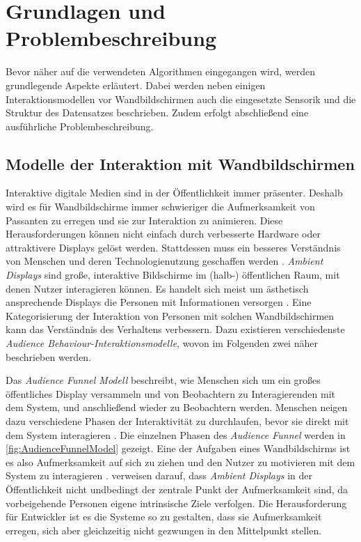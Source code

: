 \chapter{Grundlagen und Problembeschreibung}
\label{chapter2}
Bevor näher auf die verwendeten Algorithmen eingegangen wird,
werden grundlegende Aspekte erläutert.
Dabei werden neben einigen Interaktionsmodellen vor Wandbildschirmen
auch die eingesetzte Sensorik und die Struktur des Datensatzes beschrieben.
Zudem erfolgt abschließend eine ausführliche Problembeschreibung.


\section{Modelle der Interaktion mit Wandbildschirmen}
\label{2-ModelleInteraktion-Wandbildschirme}
Interaktive digitale Medien sind in der Öffentlichkeit immer präsenter.
Deshalb wird es für Wandbildschirme immer schwieriger die Aufmerksamkeit von Passanten zu erregen
und sie zur Interaktion zu animieren.
Diese Herausforderungen können nicht einfach durch verbesserte Hardware oder attraktivere Displays gelöst werden.
Stattdessen muss ein besseres Verständnis von Menschen und deren Technologienutzung geschaffen werden \citep{wouters_uncovering_2016}.
\emph{Ambient Displays} sind große, interaktive Bildschirme im (halb-) öffentlichen Raum, mit denen Nutzer interagieren können.
Es handelt sich meist um ästhetisch ansprechende Displays die Personen mit Informationen versorgen \citep{mankoff_heuristic_2003}.
Eine Kategorisierung der Interaktion von Personen mit solchen Wandbildschirmen kann das Verständnis des Verhaltens verbessern.
Dazu existieren verschiedenste \emph{Audience Behaviour-Interaktionsmodelle}, wovon im Folgenden zwei näher beschrieben werden.

Das \emph{Audience Funnel Modell} beschreibt, wie Menschen sich um ein großes öffentliches Display versammeln
und von Beobachtern zu Interagierenden mit dem System, und anschließend wieder zu Beobachtern werden.
Menschen neigen dazu verschiedene Phasen der Interaktivität zu durchlaufen,
bevor sie direkt mit dem System interagieren \citep{wouters_uncovering_2016, mai_audience_2018}.
Die einzelnen Phasen des \emph{Audience Funnel} werden in \autoref{fig:AudienceFunnelModel} gezeigt.
Eine der Aufgaben eines Wandbildschirms ist es also Aufmerksamkeit auf sich zu ziehen
und den Nutzer zu motivieren mit dem System zu interagieren \citep{mai_audience_2018}.
\citet{mai_audience_2018} verweisen darauf, dass \emph{Ambient Displays} in der Öffentlichkeit
nicht undbedingt der zentrale Punkt der Aufmerksamkeit sind, da vorbeigehende Personen eigene intrinsische Ziele verfolgen.
Die Herausforderung für Entwickler ist es die Systeme so zu gestalten,
dass sie Aufmerksamkeit erregen, sich aber gleichzeitig nicht gezwungen in den Mittelpunkt stellen.

